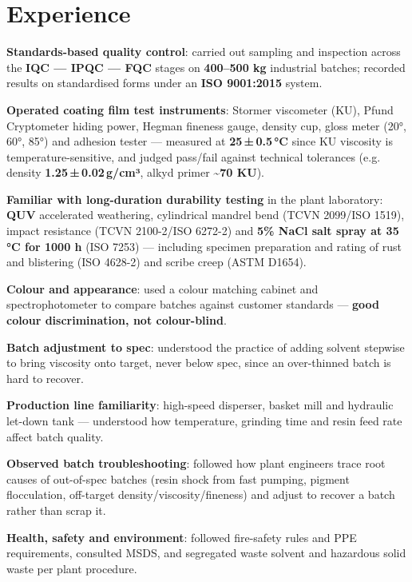 \documentclass{cvchem}
\begin{document}
\section[\icgear]{Experience}
\begin{cvitems}
  \item \textbf{Standards-based quality control}: carried out sampling and inspection across the \textbf{IQC --- IPQC --- FQC} stages on \textbf{400--500 kg} industrial batches; recorded results on standardised forms under an \textbf{ISO 9001:2015} system.
  \item \textbf{Operated coating film test instruments}: Stormer viscometer (KU), Pfund Cryptometer hiding power, Hegman fineness gauge, density cup, gloss meter (20°, 60°, 85°) and adhesion tester --- measured at \textbf{25\,±\,0.5\,°C} since KU viscosity is temperature-sensitive, and judged pass/fail against technical tolerances (e.g. density \textbf{1.25\,±\,0.02\,g/cm³}, alkyd primer \textbf{\textasciitilde70 KU}).
  \item \textbf{Familiar with long-duration durability testing} in the plant laboratory: \textbf{QUV} accelerated weathering, cylindrical mandrel bend (TCVN 2099/ISO 1519), impact resistance (TCVN 2100-2/ISO 6272-2) and \textbf{5\% NaCl salt spray at 35\,°C for 1000 h} (ISO 7253) --- including specimen preparation and rating of rust and blistering (ISO 4628-2) and scribe creep (ASTM D1654).
  \item \textbf{Colour and appearance}: used a colour matching cabinet and spectrophotometer to compare batches against customer standards --- \textbf{good colour discrimination, not colour-blind}.
  \item \textbf{Batch adjustment to spec}: understood the practice of adding solvent stepwise to bring viscosity onto target, never below spec, since an over-thinned batch is hard to recover.
  \item \textbf{Production line familiarity}: high-speed disperser, basket mill and hydraulic let-down tank --- understood how temperature, grinding time and resin feed rate affect batch quality.
  \item \textbf{Observed batch troubleshooting}: followed how plant engineers trace root causes of out-of-spec batches (resin shock from fast pumping, pigment flocculation, off-target density/viscosity/fineness) and adjust to recover a batch rather than scrap it.
  \item \textbf{Health, safety and environment}: followed fire-safety rules and PPE requirements, consulted MSDS, and segregated waste solvent and hazardous solid waste per plant procedure.
\end{cvitems}
\end{document}
